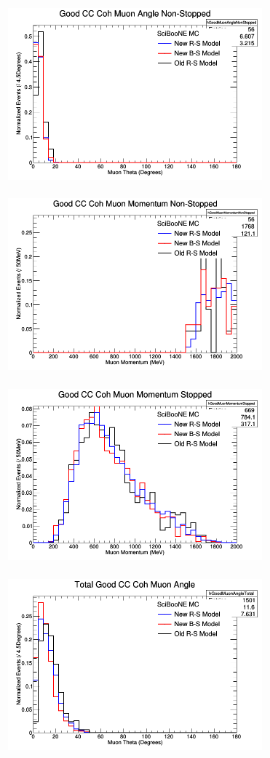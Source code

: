 \documentclass[11pt]{article}
\begin{document}
\begin{figure}[H]
\centering
\includegraphics[width=0.6\textwidth]{NMCombinedPlotsImages/11-NMCombinedPlots.png}
\caption{}
\end{figure}

\begin{figure}[H]
\centering
\includegraphics[width=0.6\textwidth]{NMCombinedPlotsImages/12-NMCombinedPlots.png}
\caption{}
\end{figure}

\begin{figure}[H]
\centering
\includegraphics[width=0.6\textwidth]{NMCombinedPlotsImages/13-NMCombinedPlots.png}
\caption{}
\end{figure}

\begin{figure}[H]
\centering
\includegraphics[width=0.6\textwidth]{NMCombinedPlotsImages/14-NMCombinedPlots.png}
\caption{}
\end{figure}
\end{document}

